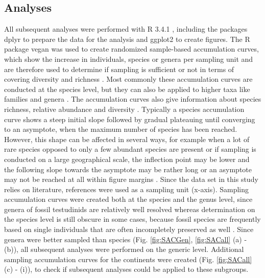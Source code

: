 \subsection{Analyses}
All subsequent analyses were performed with R 3.4.1 \citep{RCoreTeam2017}, including the packages dplyr \citep{Wickham2017} to prepare the data for the analysis and ggplot2 \citep{Wickham2009} to create figures. The R package vegan \citep{Oksanen2017} was used to create randomized sample-based accumulation curves, which show the increase in individuals, species or genera per sampling unit and are therefore used to determine if sampling is sufficient or not in terms of covering diversity and richness \citep{Thompson2002}. Most commonly these accumulation curves are conducted at the species level, but they can also be applied to higher taxa like families and genera \citep{Gotelli2011, Gotelli2001}. The accumulation curves also give information about species richness, relative abundance and diversity \citep{Thompson2002}. Typically a species accumulation curve shows a steep initial slope followed by gradual plateauing until converging to an asymptote, when the maximum number of species has been reached. However, this shape can be affected in several ways, for example when a lot of rare species opposed to only a few abundant species are present or if sampling is conducted on a large geographical scale, the inflection point may be lower and the following slope towards the asymptote may be rather long or an asymptote may not be reached at all within figure margins \citep{Gotelli2011, Gotelli2001}.
Since the data set in this study relies on literature, references were used as a sampling unit (x-axis). %
Sampling accumulation curves were created both at the species and the genus level, since genera of fossil testudinids are relatively well resolved whereas determination on the species level is still obscure in some cases, because fossil species are frequently based on single individuals that are often incompletely preserved as well \citep{Brattstrom1961, DeLapparentdeBroin2001}. Since genera were better sampled than species (Fig. \ref{fig:SACGen}, \ref{fig:SACall} (a) - (b)), all subsequent analyses were performed on the generic level.
Additional sampling accumulation curves for the continents were created (Fig. \ref{fig:SACall} (c) -  (i)), to check if subsequent analyses could be applied to these subgroups. 


